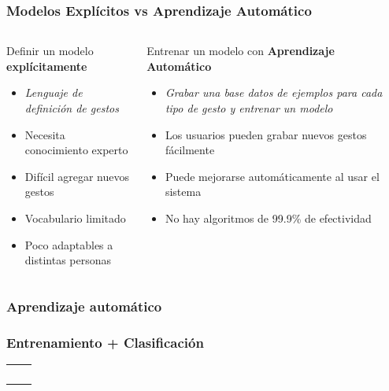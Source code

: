\begin{myframe}
\frametitle{Modelos Explícitos vs Aprendizaje Automático}
\begin{columns}
    \begin{column}{0.5\textwidth}
        \begin{block}{Definir un modelo \textbf{explícitamente}}
        \begin{itemize}
          \item \textit{Lenguaje de definición de gestos}
          \item Necesita conocimiento experto
          \item Difícil agregar nuevos gestos
          \item Vocabulario limitado
          \item Poco adaptables a distintas personas
        \end{itemize}
        \end{block}
    \end{column}
    \begin{column}{0.5\textwidth}
            \begin{block}{Entrenar un modelo con \textbf{Aprendizaje Automático}}
            \begin{itemize}
              \item \textit{Grabar una base datos de ejemplos para cada tipo de gesto y entrenar un modelo}
              \item Los usuarios pueden grabar nuevos gestos fácilmente
              \item Puede mejorarse automáticamente al usar el sistema
              \item No hay algoritmos de 99.9\% de efectividad
            \end{itemize}
            \end{block}        
    \end{column}
  \end{columns}
\end{myframe}


\begin{frame}
\frametitle{Aprendizaje automático}
\centering
\end{frame}


\begin{frame}
\frametitle{Entrenamiento + Clasificación}
\centering
   \begin{tabular}{C{0.5\linewidth}C{0.5\linewidth}}
      & 
      \\    
      [-1ex]  &  \\
      & 
      \\
      [-1ex] & 
      \end{tabular}
\end{frame}


